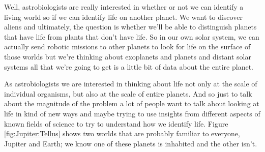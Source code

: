 \documentclass[]{article}
\begin{document}
Well, astrobiologists are really interested
in whether or not we can identify a
living world so if we can identify
life on another planet.
We want to discover aliens and
ultimately, the question is whether we'll
be able to distinguish planets that have
life from plants that don't have life. So
in our own solar system, we can actually send robotic missions to other planets to look for life on the surface of those worlds but we're thinking about exoplanets and planets and distant solar systems all that we're going to get is a little bit of data about the entire planet.

As astrobiologists we are interested in thinking about life not only at the scale of individual organisms, but also at the scale of entire planets. 
And so just to talk about the magnitude of the problem a lot of people want to talk about looking at life in kind of new ways and maybe trying to use insights from different aspects of known fields of science to try to understand how we identify life.
Figure \ref{fig:Jupiter:Tellus} shows two worlds that are probably familiar to everyone, Jupiter and Earth; we know one of these planets is inhabited and the other isn't.
\end{document}
